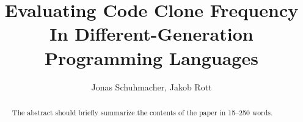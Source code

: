 \documentclass[runningheads]{llncs}
\begin{document}
%
\title{Evaluating Code Clone Frequency In Different-Generation Programming Languages}
%
%
%
\author{Jonas Schuhmacher, Jakob Rott}
%
\maketitle %
%
%
\begin{abstract}
The abstract should briefly summarize the contents of the paper in
15--250 words.

\end{abstract}
%
%






%
%
\appendix

%
%


%
\end{document}

